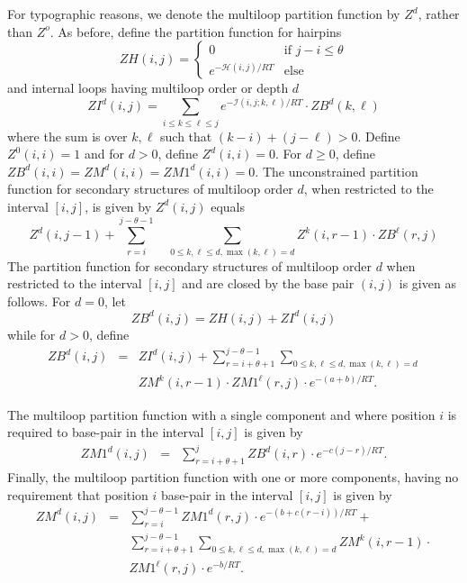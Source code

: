 For typographic reasons, we denote the multiloop partition function
by $Z^d$, rather than $Z^o$.
As before, define the partition function for hairpins
\[
ZH(i,j) =
\left\{ \begin{array}{ll}
0 &\mbox{if $j-i \leq \theta$}\\
e^{-\mathcal{H}(i,j)/RT} &\mbox{else}
\end{array} \right.
\]
and internal loops having multiloop order or depth $d$
\[
ZI^d(i,j) =  \displaystyle\sum_{i \leq k \leq \ell \leq j}
e^{-\mathcal{I}(i,j;k,\ell)/RT} \cdot ZB^d(k,\ell)
\]
where the sum is over $k,\ell$ such that $(k-i)+(j-\ell)>0$.
Define $Z^0(i,i)=1$ and for $d> 0$, define $Z^d(i,i)=0$.
For $d\geq 0$, define $ZB^d(i,i)= ZM^d(i,i)= ZM1^d(i,i)=0$.
The unconstrained partition function for secondary structures of multiloop
order $d$, when
restricted to the interval $[i,j]$, is given by
$Z^d(i,j)$ equals
\[
Z^d(i,j-1) + \sum_{r=i}^{j-\theta-1} \quad
    \sum_{0 \leq k,\ell \leq d, \max(k,\ell)=d}
    Z^k(i,r-1) \cdot ZB^\ell(r,j)
\]
The partition function for secondary structures of multiloop order $d$
when restricted to the
interval $[i,j]$  and are closed by
the base pair $(i,j)$ is given as follows.
For $d=0$, let
\[
ZB^d(i,j) =
ZH(i,j) + ZI^d(i,j)
\]
while for $d>0$, define
\begin{eqnarray*}
ZB^d(i,j) &=&
ZI^d(i,j) + \sum_{r=i+\theta+1}^{j-\theta-1}
    \sum_{0 \leq k,\ell \leq d, \max(k,\ell)=d} \\
&&    ZM^k(i,r-1)  \cdot
ZM1^\ell(r,j)  \cdot e^{-(a+b)/RT}.
\end{eqnarray*}


The multiloop partition function with a single component and where
position $i$ is required to base-pair in the interval $[i,j]$ is given by
\begin{eqnarray}
ZM1^{d}(i,j) &= &
\displaystyle\sum_{r=i+\theta+1}^j ZB^d(i,r) \cdot
e^{-c(j-r)/RT}.
\end{eqnarray}
Finally, the multiloop partition function with one or more components,
having no requirement that position $i$ base-pair in the interval $[i,j]$
is given by
\begin{eqnarray}
ZM^{d}(i,j) &=&
\sum_{r=i}^{j-\theta-1}  ZM1^{d}(r,j) \cdot
e^{-(b+c(r-i))/RT}  + \\
&& \sum_{r=i+\theta+1}^{j-\theta-1}
  \sum_{0 \leq k,\ell \leq d, \max(k,\ell)=d} ZM^{k}(i,r-1) \cdot
\nonumber\\
&&ZM1^{\ell}(r,j) \cdot e^{-b/RT}.  \nonumber
\end{eqnarray}

